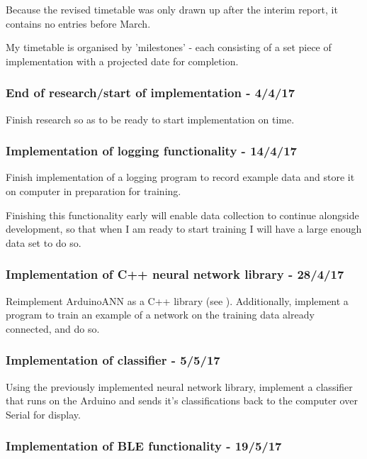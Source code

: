 \documentclass[a4paper]{article}
\begin{document}
Because the revised timetable was only drawn up after the interim report, it contains no entries before March.

My timetable is organised by 'milestones' - each consisting of a set piece of implementation with a projected date for completion.

\subsubsection{End of research/start of implementation - 4/4/17}

Finish research so as to be ready to start implementation on time.

\subsubsection{Implementation of logging functionality - 14/4/17}

Finish implementation of a logging program to record example data and store it on computer in preparation for training.

Finishing this functionality early will enable data collection to continue alongside development, so that when I am ready to start training I will have a large enough data set to do so.

\subsubsection{Implementation of C++ neural network library - 28/4/17}

Reimplement ArduinoANN as a C++ library (see ). Additionally, implement a program to train an example of a network on the training data already connected, and do so.

\subsubsection{Implementation of classifier - 5/5/17}

Using the previously implemented neural network library, implement a classifier that runs on the Arduino and sends it's classifications back to the computer over Serial for display.

\subsubsection{Implementation of BLE functionality - 19/5/17}
\end{document}
